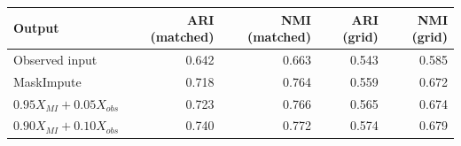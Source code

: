\begin{tabular}{lrrrr}
\toprule
Output & ARI (matched) & NMI (matched) & ARI (grid) & NMI (grid) \\
\midrule
Observed input & 0.642 & 0.663 & 0.543 & 0.585 \\
MaskImpute & 0.718 & 0.764 & 0.559 & 0.672 \\
$0.95X_{MI}+0.05X_{obs}$ & 0.723 & 0.766 & 0.565 & 0.674 \\
$0.90X_{MI}+0.10X_{obs}$ & 0.740 & 0.772 & 0.574 & 0.679 \\
\bottomrule
\end{tabular}
